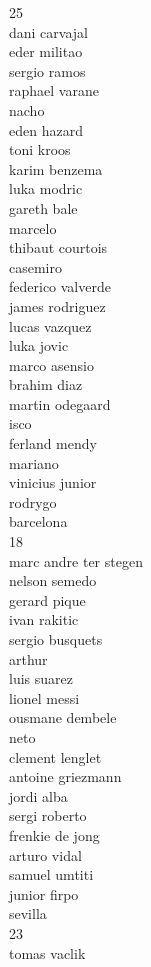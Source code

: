 \documentclass[]{article}
\begin{document}
{25\\
dani carvajal\\
eder militao\\
sergio ramos\\
raphael varane\\
nacho\\
eden hazard\\
toni kroos\\
karim benzema\\
luka modric\\
gareth bale\\
marcelo\\
thibaut courtois\\
casemiro\\
federico valverde\\
james rodriguez\\
lucas vazquez\\
luka jovic\\
marco asensio\\
brahim diaz\\
martin odegaard\\
isco\\
ferland mendy\\
mariano\\
vinicius junior\\
rodrygo\\
barcelona\\
18\\
marc andre ter stegen\\
nelson semedo\\
gerard pique\\
ivan rakitic\\
sergio busquets\\
arthur\\
luis suarez\\
lionel messi\\
ousmane dembele\\
neto\\
clement lenglet\\
antoine griezmann\\
jordi alba\\
sergi roberto\\
frenkie de jong\\
arturo vidal\\
samuel umtiti\\
junior firpo\\
sevilla\\
23\\
tomas vaclik\\
}
\end{document}
